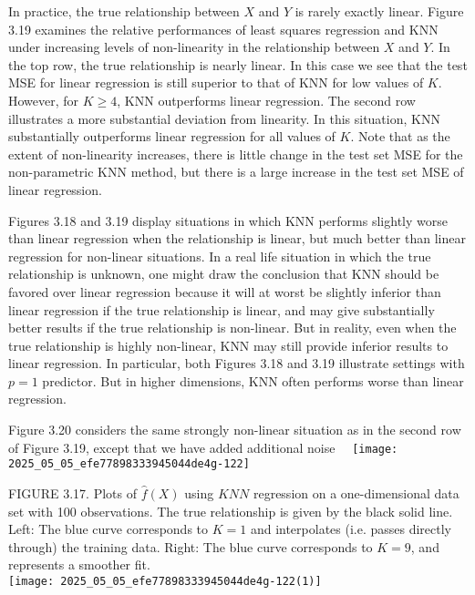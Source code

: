 \documentclass[10pt]{article}
\begin{document}
In practice, the true relationship between $X$ and $Y$ is rarely exactly linear. Figure 3.19 examines the relative performances of least squares regression and KNN under increasing levels of non-linearity in the relationship between $X$ and $Y$. In the top row, the true relationship is nearly linear. In this case we see that the test MSE for linear regression is still superior to that of KNN for low values of $K$. However, for $K \geq 4$, KNN outperforms linear regression. The second row illustrates a more substantial deviation from linearity. In this situation, KNN substantially outperforms linear regression for all values of $K$. Note that as the extent of non-linearity increases, there is little change in the test set MSE for the non-parametric KNN method, but there is a large increase in the test set MSE of linear regression.

Figures 3.18 and 3.19 display situations in which KNN performs slightly worse than linear regression when the relationship is linear, but much better than linear regression for non-linear situations. In a real life situation in which the true relationship is unknown, one might draw the conclusion that KNN should be favored over linear regression because it will at worst be slightly inferior than linear regression if the true relationship is linear, and may give substantially better results if the true relationship is non-linear. But in reality, even when the true relationship is highly non-linear, KNN may still provide inferior results to linear regression. In particular, both Figures 3.18 and 3.19 illustrate settings with $p=1$ predictor. But in higher dimensions, KNN often performs worse than linear regression.

Figure 3.20 considers the same strongly non-linear situation as in the second row of Figure 3.19, except that we have added additional noise\
\
\texttt{[image: 2025\_05\_05\_efe77898333945044de4g-122]}

FIGURE 3.17. Plots of $\hat{f}(X)$ using $K N N$ regression on a one-dimensional data set with 100 observations. The true relationship is given by the black solid line. Left: The blue curve corresponds to $K=1$ and interpolates (i.e. passes directly through) the training data. Right: The blue curve corresponds to $K=9$, and represents a smoother fit.\\
\texttt{[image: 2025\_05\_05\_efe77898333945044de4g-122(1)]}
\end{document}
